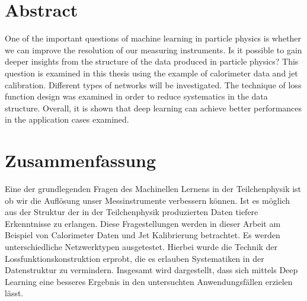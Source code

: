 \chapter*{Abstract}

One of the important questions of machine learning in particle physics
is whether we can improve the resolution of our measuring
instruments. Is it possible to gain deeper insights from the structure
of the data produced in particle physics? This question is examined in
this thesis using the example of calorimeter data and jet
calibration. Different types of networks will be investigated. The
technique of loss function design was examined in order to reduce
systematics in the data structure. Overall, it is shown that deep
learning can achieve better performances in the application cases
examined.

\chapter*{Zusammenfassung}
Eine der grundlegenden Fragen des Machinellen Lernens in der
Teilchenphysik ist ob wir die Auflösung unser Messinstrumente
verbessern können. Ist es möglich aus der Struktur der in der
Teilchenphysik produzierten Daten tiefere Erkenntnisse zu
erlangen. Diese Fragestellungen werden in dieser Arbeit am Beispiel
von Calorimeter Daten und Jet Kalibrierung betrachtet. Es werden
unterschiedliche Netzwerktypen ausgetestet. Hierbei wurde die Technik
der Lossfunktionskonstruktion erprobt, die es erlauben Systematiken in
der Datenstruktur zu vermindern. Insgesamt wird dargestellt, dass sich
mittels Deep Learning eine besseres Ergebnis in den untersuchten
Anwendungsfällen erzielen lässt.
